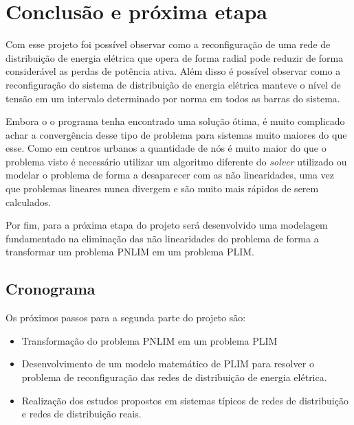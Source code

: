 \section{Conclusão e próxima etapa}

Com esse projeto foi possível observar como a reconfiguração de uma rede de distribuição de energia elétrica que opera de forma radial pode reduzir de forma considerável as perdas de potência ativa. 
Além disso é possível observar como a reconfiguração do sistema de distribuição de energia elétrica manteve o nível de tensão em um intervalo determinado por norma em todos as barras do sistema.

Embora o o programa tenha encontrado uma solução ótima, é muito complicado achar a convergência desse tipo de problema para sistemas muito maiores do que esse. 
Como em centros urbanos a quantidade de nós é muito maior do que o problema visto é necessário utilizar um algoritmo diferente do \emph{solver} utilizado ou modelar o problema de forma a desaparecer com as não linearidades, uma vez que problemas lineares nunca divergem e são muito mais rápidos de serem calculados.

Por fim, para a próxima etapa do projeto será desenvolvido uma modelagem fundamentado na eliminação das não linearidades do problema de forma a transformar um problema PNLIM em um problema PLIM.


\subsection{Cronograma}

Os próximos passos para a segunda parte do projeto são:

\begin{itemize}
    \item Transformação do problema PNLIM em um problema PLIM
    
    \item Desenvolvimento de um modelo matemático de PLIM para resolver o problema de reconfiguração das redes de distribuição de energia elétrica.
    
    \item Realização dos estudos propostos em sistemas típicos de redes de distribuição e redes de distribuição reais. 
\end{itemize}